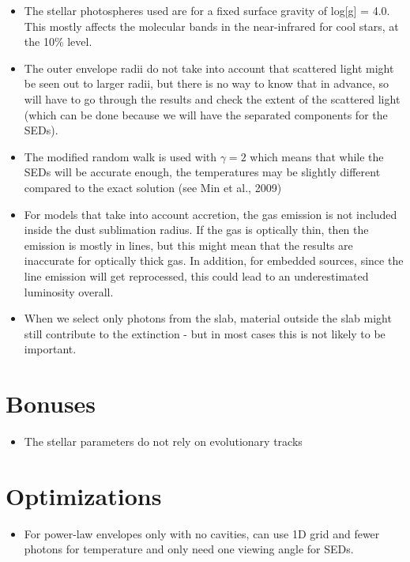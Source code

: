 \documentclass[10pt]{article}
\begin{document}
\begin{itemize}

\item The stellar photospheres used are for a fixed surface gravity of log[g] = 4.0. This mostly affects the molecular bands in the near-infrared for cool stars, at the 10\% level.

\item The outer envelope radii do not take into account that scattered light might be seen out to larger radii, but there is no way to know that in advance, so will have to go through the results and check the extent of the scattered light (which can be done because we will have the separated components for the SEDs).

\item The modified random walk is used with $\gamma=2$ which means that while the SEDs will be accurate enough, the temperatures may be slightly different compared to the exact solution (see Min et al., 2009)

\item For models that take into account accretion, the gas emission is not included inside the dust sublimation radius. If the gas is optically thin, then the emission is mostly in lines, but this might mean that the results are inaccurate for optically thick gas. In addition, for embedded sources, since the line emission will get reprocessed, this could lead to an underestimated luminosity overall.

\item When we select only photons from the slab, material outside the slab might still contribute to the extinction - but in most cases this is not likely to be important.

\end{itemize}

\section{Bonuses}

\begin{itemize}

\item The stellar parameters do not rely on evolutionary tracks

\end{itemize}

\section{Optimizations}

\begin{itemize}
\item For power-law envelopes only with no cavities, can use 1D grid and fewer photons for temperature and only need one viewing angle for SEDs.
\end{itemize}
\end{document}

